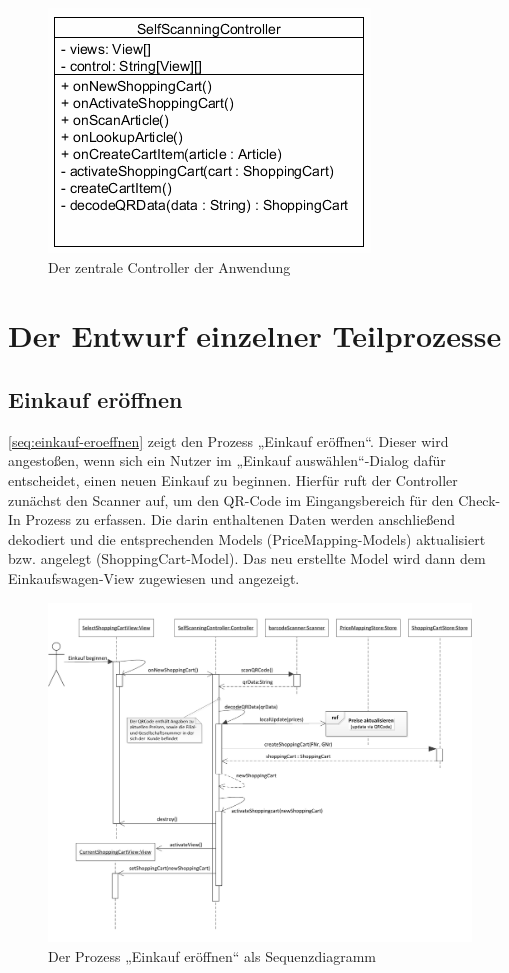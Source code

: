 \begin{figure}[H]
\includegraphics[scale=1]{res/controller.png}
\caption{Der zentrale Controller der Anwendung}
\end{figure}

\section{Der Entwurf einzelner Teilprozesse}
\subsection{Einkauf eröffnen}
\vref*{seq:einkauf-eroeffnen} zeigt den Prozess „Einkauf eröffnen“. Dieser wird angestoßen, wenn sich ein Nutzer im „Einkauf auswählen“-Dialog dafür entscheidet, einen neuen Einkauf zu beginnen. Hierfür ruft der Controller zunächst den Scanner auf, um den QR-Code im Eingangsbereich für den Check-In Prozess zu erfassen. Die darin enthaltenen Daten werden anschließend dekodiert und die entsprechenden Models (PriceMapping-Models) aktualisiert bzw. angelegt (ShoppingCart-Model). Das neu erstellte Model wird dann dem Einkaufswagen-View zugewiesen und angezeigt.

\begin{figure}[H]
\includegraphics[width=\linewidth]{res/seq_einkauf-eroeffnen.pdf}
\caption{Der Prozess „Einkauf eröffnen“ als Sequenzdiagramm}\label{seq:einkauf-eroeffnen}
\end{figure}

